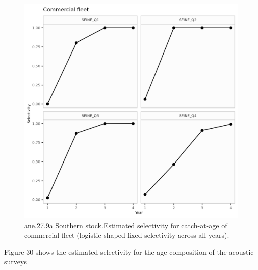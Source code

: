 \documentclass[
]{article}
\begin{document}
\begin{figure}[H]

{\centering \includegraphics[width=0.95\linewidth]{report/run/S1.0_4FLEETS_SelECO_RecIndex_Mnewfix/fig_Sel_commercial_fleet} 

}

\caption{ane.27.9a Southern stock.Estimated selectivity for catch-at-age of commercial fleet (logistic shaped fixed selectivity across all years).}\label{fig:unnamed-chunk-35}
\end{figure}

Figure 30 shows the estimated selectivity for the age composition of the
acoustic surveys
\end{document}
